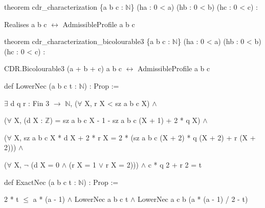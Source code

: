 \documentclass[spanish,11pt,a4paper]{article}
\begin{document}
\noindent\hspace*{0.0em}theorem cdr\_\allowbreak{}characterization \{a b c : \(\mathbb N\)\} (ha : 0 < a) (hb : 0 < b) (hc : 0 < c) :\par
\noindent\hspace*{1.8em}Realises a b c \(\leftrightarrow\) AdmissibleProfile a b c\par
\noindent\hspace*{0.0em}\par
\noindent\hspace*{0.0em}theorem cdr\_\allowbreak{}characterization\_\allowbreak{}bicolourable3 \{a b c : \(\mathbb N\)\} (ha : 0 < a) (hb : 0 < b) (hc : 0 < c) :\par
\noindent\hspace*{1.8em}CDR.Bicolourable3 (a + b + c) a b c \(\leftrightarrow\) AdmissibleProfile a b c\par
\noindent\hspace*{0.0em}\par
\noindent\hspace*{0.0em}def LowerNec (a b c t : \(\mathbb N\)) : Prop :=\par
\noindent\hspace*{0.9em}\(\exists\) d q r : Fin 3 \(\to\) \(\mathbb N\), (\(\forall\) X, r X < sz a b c X) \(\land\)\par
\noindent\hspace*{1.8em}(\(\forall\) X, (d X : \(\mathbb Z\)) = sz a b c X - 1 - sz a b c (X + 1) + 2 * q X) \(\land\)\par
\noindent\hspace*{1.8em}(\(\forall\) X, sz a b c X * d X + 2 * r X = 2 * (sz a b c (X + 2) * q (X + 2) + r (X + 2))) \(\land\)\par
\noindent\hspace*{1.8em}(\(\forall\) X, \(\neg\) (d X = 0 \(\land\) (r X = 1 \(\lor\) r X = 2))) \(\land\) c * q 2 + r 2 = t\par
\noindent\hspace*{0.0em}\par
\noindent\hspace*{0.0em}def ExactNec (a b c t : \(\mathbb N\)) : Prop :=\par
\noindent\hspace*{0.9em}2 * t \(\le\) a * (a - 1) \(\land\) LowerNec a b c t \(\land\) LowerNec a c b (a * (a - 1) / 2 - t)\par
\noindent\hspace*{0.0em}\par
\end{document}
